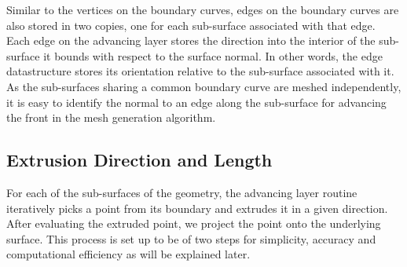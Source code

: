 Similar to the vertices on the boundary curves, edges on the boundary curves are also stored in two copies, one for each sub-surface associated with that edge. Each edge on the advancing layer stores the direction into the interior of the sub-surface it bounds with respect to the surface normal. In other words, the edge datastructure stores its orientation relative to the sub-surface associated with it. As the sub-surfaces sharing a common boundary curve are meshed independently, it is easy to identify the normal to an edge along the sub-surface for advancing the front in the mesh generation algorithm.

%  

\subsection{Extrusion Direction and Length} \label{advancing-layer}

For each of the sub-surfaces of the geometry, the advancing layer routine iteratively picks a point from its boundary and extrudes it in a given direction. After evaluating the extruded point, we project the point onto the underlying surface. This process is set up to be of two steps for simplicity, accuracy and computational efficiency as will be explained later.

